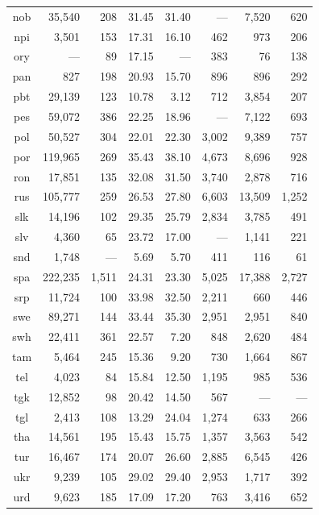 \begin{table}[!htb]
\begin{tabular}{@{}crrrrrrr@{}}
nob  &  35,540 &  208 &  31.45 &  31.40 &   ---  &  7,520 &  620\\
npi  &  3,501 &  153 &  17.31 &  16.10 &  462 &  973 &  206\\
ory  &   ---  &  89 &  17.15 &   ---  &  383 &  76 &  138\\
pan  &  827 &  198 &  20.93 &  15.70 &  896 &  896 &  292\\
pbt  &  29,139 &  123 &  10.78 &   3.12 &  712 &  3,854 &  207\\
pes  &  59,072 &  386 &  22.25 &  18.96 &   ---  &  7,122 &  693\\
pol  &  50,527 &  304 &  22.01 &  22.30 &  3,002 &  9,389 &  757\\
por  &  119,965 &  269 &  35.43 &  38.10 &  4,673 &  8,696 &  928\\
ron  &  17,851 &  135 &  32.08 &  31.50 &  3,740 &  2,878 &  716\\
rus  &  105,777 &  259 &  26.53 &  27.80 &  6,603 &  13,509 &  1,252\\
slk  &  14,196 &  102 &  29.35 &  25.79 &  2,834 &  3,785 &  491\\
slv  &  4,360 &  65 &  23.72 &  17.00 &   ---  &  1,141 &  221\\
snd  &  1,748 &   ---  &   5.69 &   5.70 &  411 &  116 &  61\\
spa  &  222,235 &  1,511 &  24.31 &  23.30 &  5,025 &  17,388 &  2,727\\
srp  &  11,724 &  100 &  33.98 &  32.50 &  2,211 &  660 &  446\\
swe  &  89,271 &  144 &  33.44 &  35.30 &  2,951 &  2,951 &  840\\
swh  &  22,411 &  361 &  22.57 &   7.20 &  848 &  2,620 &  484\\
tam  &  5,464 &  245 &  15.36 &   9.20 &  730 &  1,664 &  867\\
tel  &  4,023 &  84 &  15.84 &  12.50 &  1,195 &  985 &  536\\
tgk  &  12,852 &  98 &  20.42 &  14.50 &  567 &   ---  &   --- \\
tgl  &  2,413 &  108 &  13.29 &  24.04 &  1,274 &  633 &  266\\
tha  &  14,561 &  195 &  15.43 &  15.75 &  1,357 &  3,563 &  542\\
tur  &  16,467 &  174 &  20.07 &  26.60 &  2,885 &  6,545 &  426\\
ukr  &  9,239 &  105 &  29.02 &  29.40 &  2,953 &  1,717 &  392\\
urd  &  9,623 &  185 &  17.09 &  17.20 &  763 &  3,416 &  652\\

\end{tabular}
\end{table}
